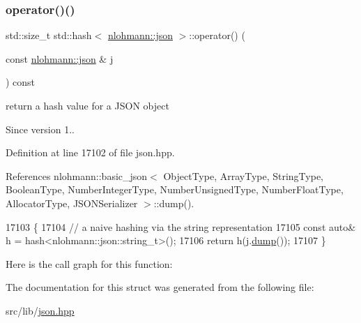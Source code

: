 \subsubsection{\texorpdfstring{operator()()}{operator()()}}
{\footnotesize\ttfamily std\+::size\+\_\+t std\+::hash$<$ \hyperlink{namespacenlohmann_a2bfd99e845a2e5cd90aeaf1b1431f474}{nlohmann\+::json} $>$\+::operator() (\begin{DoxyParamCaption}\item[{const \hyperlink{namespacenlohmann_a2bfd99e845a2e5cd90aeaf1b1431f474}{nlohmann\+::json} \&}]{j }\end{DoxyParamCaption}) const\hspace{0.3cm}{\ttfamily [inline]}}



return a hash value for a J\+S\+ON object 

\begin{DoxySince}{Since}
version 1.. 
\end{DoxySince}


Definition at line 17102 of file json.\+hpp.



References nlohmann\+::basic\+\_\+json$<$ Object\+Type, Array\+Type, String\+Type, Boolean\+Type, Number\+Integer\+Type, Number\+Unsigned\+Type, Number\+Float\+Type, Allocator\+Type, J\+S\+O\+N\+Serializer $>$\+::dump().


\begin{DoxyCode}
17103     \{
17104         \textcolor{comment}{// a naive hashing via the string representation}
17105         \textcolor{keyword}{const} \textcolor{keyword}{auto}& h = hash<nlohmann::json::string\_t>();
17106         \textcolor{keywordflow}{return} h(j.\hyperlink{classnlohmann_1_1basic__json_a5adea76fedba9898d404fef8598aa663}{dump}());
17107     \}
\end{DoxyCode}
Here is the call graph for this function\+:


The documentation for this struct was generated from the following file\+:\begin{DoxyCompactItemize}
\item 
src/lib/\hyperlink{json_8hpp}{json.\+hpp}\end{DoxyCompactItemize}
